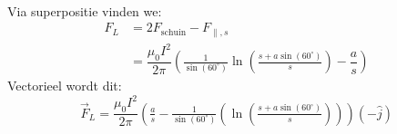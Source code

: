 \begin{enumerate}[(a)]
\begin{description}[labelwidth=1.5cm, leftmargin=!]
\begin{align*}
                            \end{align*}
                            Via superpositie vinden we: 
                            \begin{align*}
                                F_L &= 2F_{\text{schuin}} - F_{\parallel, s} \\
                                    &= \dfrac{\mu_0I^2}{2\pi}\left(\tfrac{1}{\sin(60^\circ)}\ln(\tfrac{s+a\sin(60^\circ)}{s}) - \dfrac{a}{s}\right)
                            \end{align*}
                            Vectorieel wordt dit:
                            \begin{equation*}
                                \Vec{F}_L = \dfrac{\mu_0I^2}{2\pi}\left( \tfrac{a}{s} - \tfrac{1}{\sin(60^\circ)}\left(\ln(\tfrac{s+a\sin(60^\circ)}{s}) \right) \right) (-\hat{j})
                            \end{equation*}
        \end{description}
        
\end{enumerate}

\vspace{1cm}